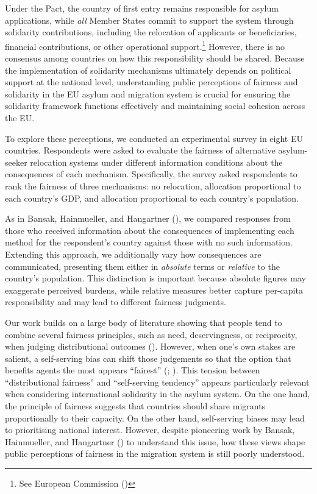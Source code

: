 \documentclass[
  12pt,
  a4paper,
]{article}
\begin{document}
Under the Pact, the country of first entry remains responsible for asylum applications, while \emph{all} Member States commit to support the system through solidarity contributions, including the relocation of applicants or beneficiaries, financial contributions, or other operational support.\footnote{See European Commission ()} However, there is no consensus among countries on how this responsibility should be shared. Because the implementation of solidarity mechanisms ultimately depends on political support at the national level, understanding public perceptions of fairness and solidarity in the EU asylum and migration system is crucial for ensuring the solidarity framework functions effectively and maintaining social cohesion across the EU.

To explore these perceptions, we conducted an experimental survey in eight EU countries. Respondents were asked to evaluate the fairness of alternative asylum-seeker relocation systems under different information conditions about the consequences of each mechanism. Specifically, the survey asked respondents to rank the fairness of three mechanisms: no relocation, allocation proportional to each country's GDP, and allocation proportional to each country's population.

As in Bansak, Hainmueller, and Hangartner (), we compared responses from those who received information about the consequences of implementing each method for the respondent's country against those with no such information. Extending this approach, we additionally vary how consequences are communicated, presenting them either in \emph{absolute} terms or \emph{relative} to the country's population. This distinction is important because absolute figures may exaggerate perceived burdens, while relative measures better capture per-capita responsibility and may lead to different fairness judgments.

Our work builds on a large body of literature showing that people tend to combine several fairness principles, such as need, deservingness, or reciprocity, when judging distributional outcomes (). However, when one's own stakes are salient, a self-serving bias can shift those judgements so that the option that benefits agents the most appears ``fairest'' (; ). This tension between ``distributional fairness'' and ``self-serving tendency'' appears particularly relevant when considering international solidarity in the asylum system. On the one hand, the principle of fairness suggests that countries should share migrants proportionally to their capacity. On the other hand, self-serving biases may lead to prioritising national interest. However, despite pioneering work by Bansak, Hainmueller, and Hangartner () to understand this issue, how these views shape public perceptions of fairness in the migration system is still poorly understood.
\end{document}
